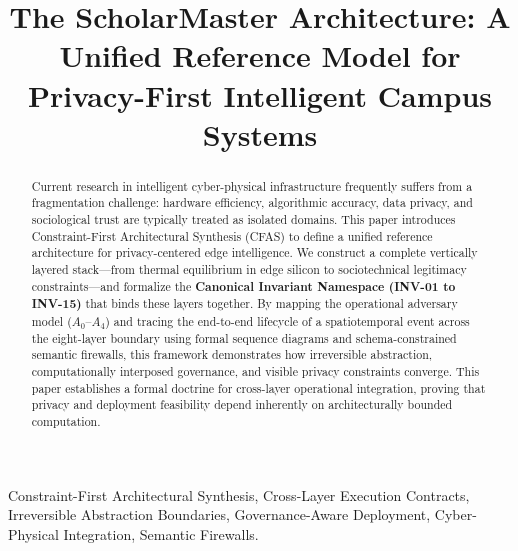\documentclass[conference]{IEEEtran}
\begin{document}
\title{The ScholarMaster Architecture: A Unified Reference Model for Privacy-First Intelligent Campus Systems}

\author{
}

\maketitle

\begin{abstract}
Current research in intelligent cyber-physical infrastructure frequently suffers from a fragmentation challenge: hardware efficiency, algorithmic accuracy, data privacy, and sociological trust are typically treated as isolated domains. This paper introduces Constraint-First Architectural Synthesis (CFAS) to define a unified reference architecture for privacy-centered edge intelligence. We construct a complete vertically layered stack---from thermal equilibrium in edge silicon to sociotechnical legitimacy constraints---and formalize the \textbf{Canonical Invariant Namespace (INV-01 to INV-15)} that binds these layers together. By mapping the operational adversary model ($A_0$--$A_4$) and tracing the end-to-end lifecycle of a spatiotemporal event across the eight-layer boundary using formal sequence diagrams and schema-constrained semantic firewalls, this framework demonstrates how irreversible abstraction, computationally interposed governance, and visible privacy constraints converge. This paper establishes a formal doctrine for cross-layer operational integration, proving that privacy and deployment feasibility depend inherently on architecturally bounded computation.
\end{abstract}

\begin{IEEEkeywords}
Constraint-First Architectural Synthesis, Cross-Layer Execution Contracts, Irreversible Abstraction Boundaries, Governance-Aware Deployment, Cyber-Physical Integration, Semantic Firewalls.
\end{IEEEkeywords}
\end{document}
